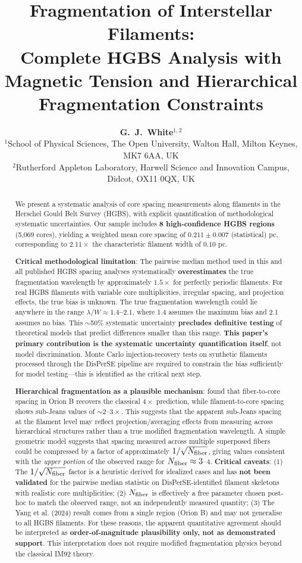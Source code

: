 \documentclass[11pt,a4paper]{article}
\title{\textbf{Fragmentation of Interstellar Filaments:\\
Complete HGBS Analysis with Magnetic Tension and Hierarchical Fragmentation Constraints}}
\author{\textbf{G.~J.~White$^{1,2}$}\\
\small{$^{1}$School of Physical Sciences, The Open University, Walton Hall, Milton Keynes, MK7 6AA, UK}\\
\small{$^{2}$Rutherford Appleton Laboratory, Harwell Science and Innovation Campus, Didcot, OX11 0QX, UK}}
\begin{document}
\maketitle

\begin{abstract}
We present a systematic analysis of core spacing measurements along filaments in the Herschel Gould Belt Survey (HGBS), with explicit quantification of methodological systematic uncertainties. Our sample includes \textbf{8 high-confidence HGBS regions} (5,069 cores), yielding a weighted mean core spacing of $0.211 \pm 0.007$ (statistical) pc, corresponding to $2.11\times$ the characteristic filament width of $0.10$ pc.

\textbf{Critical methodological limitation}: The pairwise median method used in this and all published HGBS spacing analyses systematically \textbf{overestimates} the true fragmentation wavelength by approximately $1.5\times$ for perfectly periodic filaments. For real HGBS filaments with variable core multiplicities, irregular spacing, and projection effects, the true bias is unknown. The true fragmentation wavelength could lie anywhere in the range \textbf{$\lambda/W \approx 1.4$--$2.1$}, where 1.4 assumes the maximum bias and 2.1 assumes no bias. This $\sim$50\% systematic uncertainty \textbf{precludes definitive testing} of theoretical models that predict differences smaller than this range. \textbf{This paper's primary contribution is the systematic uncertainty quantification itself}, not model discrimination. Monte Carlo injection-recovery tests on synthetic filaments processed through the DisPerSE pipeline are required to constrain the bias sufficiently for model testing—this is identified as the critical next step.

\textbf{Hierarchical fragmentation as a plausible mechanism}: \citet{Yang2024} found that fiber-to-core spacing in Orion B recovers the classical $4\times$ prediction, while filament-to-core spacing shows sub-Jeans values of $\sim2$--$3\times$. This suggests that the apparent sub-Jeans spacing at the filament level may reflect projection/averaging effects from measuring across hierarchical structures rather than a true modified fragmentation wavelength. A simple geometric model suggests that spacing measured across multiple superposed fibers could be compressed by a factor of approximately $1/\sqrt{N_{\rm fiber}}$, giving values consistent with the \textit{upper portion} of the observed range for $N_{\rm fiber} \approx 3$--$4$. \textbf{Critical caveats}: (1) The $1/\sqrt{N_{\rm fiber}}$ factor is a heuristic derived for idealized cases and has \textbf{not been validated} for the pairwise median statistic on DisPerSE-identified filament skeletons with realistic core multiplicities; (2) $N_{\rm fiber}$ is effectively a free parameter chosen post-hoc to match the observed range, not an independently measured quantity; (3) The Yang et al. (2024) result comes from a single region (Orion B) and may not generalise to all HGBS filaments. For these reasons, the apparent quantitative agreement should be interpreted as \textbf{order-of-magnitude plausibility only, not as demonstrated support}. This interpretation does not require modified fragmentation physics beyond the classical IM92 theory.


\end{abstract}
\end{document}
